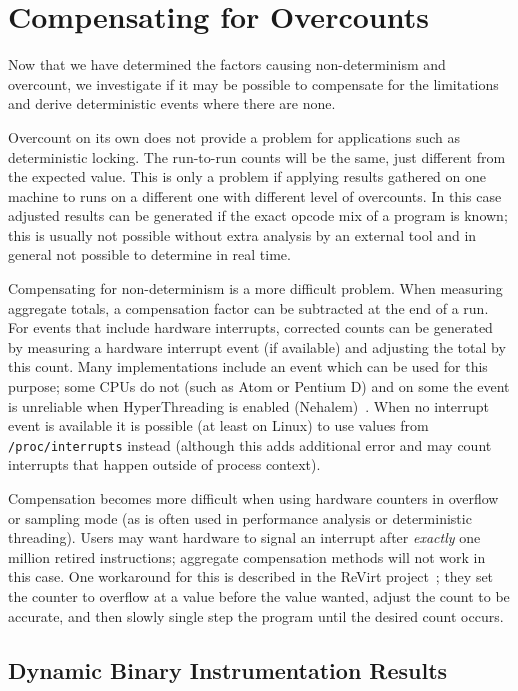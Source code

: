 \section{Compensating for Overcounts}
Now that we have determined the factors causing non-determinism
and overcount, we investigate if it may be possible to compensate for
the limitations and derive deterministic events where there are none.

Overcount on its own does not provide a problem for applications
such as deterministic locking.
The run-to-run counts will be the same,
just different from the expected value.  
This is only a problem if applying results gathered on one 
machine to runs on a different one with different level of overcounts.  
In this case adjusted results
can be generated if the exact opcode mix of a program is known; this
is usually not possible without extra analysis by an external tool
and in general not possible to determine in real time.

Compensating for non-determinism is a more difficult problem.
When measuring aggregate totals, a compensation factor can
be subtracted at the end of a run.
For events that include hardware interrupts, corrected counts can be 
generated by measuring a hardware interrupt event (if available)
and adjusting the total by this count.
Many implementations include an event
which can be used for this purpose; some CPUs do not (such
as Atom or Pentium D) and on some the event is unreliable
when HyperThreading is enabled (Nehalem)~\cite{segulja:pc2012}.
When no interrupt event is available it is 
possible (at least on Linux) to use values from
{\tt /proc/interrupts} instead (although this adds additional error and 
may count interrupts that happen outside of process context).

Compensation becomes more difficult when using hardware counters
in overflow or sampling mode (as is often used in performance
analysis or deterministic threading).  
Users may want hardware to signal an interrupt
after {\em exactly} one million retired instructions; aggregate
compensation methods will not work in this case.
One workaround
for this is described in the ReVirt project~\cite{dunlap+:osdi02};
they set the counter to overflow at a value before the value wanted,
adjust the count to be accurate, and then slowly single step the 
program until the desired count occurs.

\subsection{Dynamic Binary Instrumentation Results}

